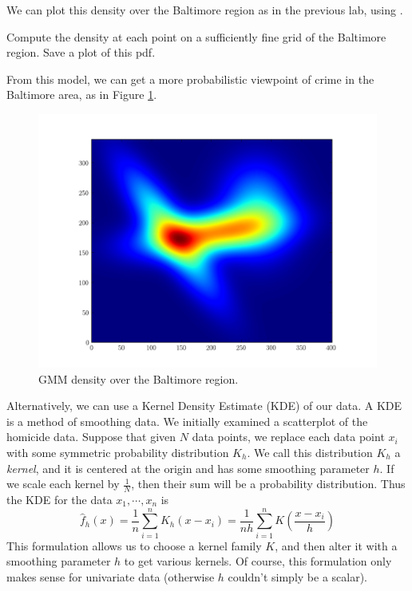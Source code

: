 We can plot this density over the Baltimore region as in the previous lab, using .

\begin{problem}
Compute the density at each point on a sufficiently fine grid of the Baltimore region. Save a plot of this pdf.
\end{problem}

From this model, we can get a more probabilistic viewpoint of crime in the Baltimore area, as in Figure \ref{fig:baltimoregmm}.

\begin{figure}[h]
\centering
\includegraphics[width=\textwidth]{baltimore_gmm.pdf}
\caption{GMM density over the Baltimore region.}
\label{fig:baltimoregmm}
\end{figure}

Alternatively, we can use a Kernel Density Estimate (KDE) of our data. A KDE is a method of smoothing data. We initially examined a scatterplot of the homicide data. Suppose that given $N$ data points, we replace each data point $x_{i}$ with some symmetric probability distribution $K_{h}$. We call this distribution $K_{h}$ a \emph{kernel}, and it is centered at the origin and has some smoothing parameter $h$. If we scale each kernel by $\frac{1}{N}$, then their sum will be a probability distribution. Thus the KDE for the data $x_{1}, \cdots, x_{n}$ is
\begin{equation*}
\widehat{f}_{h}(x) = \frac{1}{n} \sum_{i=1}^{n} K_{h}(x - x_{i}) = \frac{1}{nh} \sum_{i=1}^{n} K(\frac{x - x_{i}}{h})
\end{equation*}
This formulation allows us to choose a kernel family $K$, and then alter it with a smoothing parameter $h$ to get various kernels. Of course, this formulation only makes sense for univariate data (otherwise $h$ couldn't simply be a scalar).

